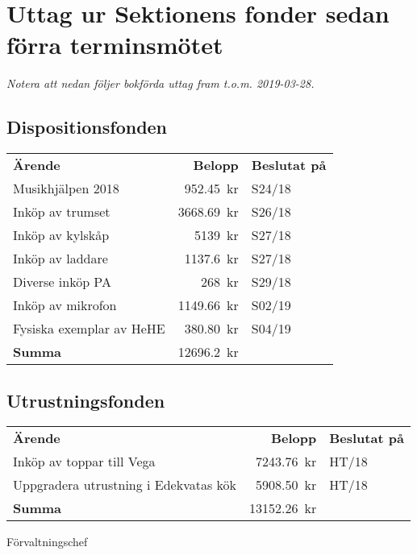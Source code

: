 \documentclass[../_main/handlingar.tex]{subfiles}
\begin{document}
\section{Uttag ur Sektionens fonder sedan förra terminsmötet}
\emph{Notera att nedan följer bokförda uttag fram t.o.m. 2019-03-28.}

\subsection*{Dispositionsfonden}
\begin{tabular}{l r l}
    \textbf{Ärende} & \textbf{Belopp} & \textbf{Beslutat på} \\
    Musikhjälpen 2018 & \SI{952,45}{kr} & S24/18 \\
    Inköp av trumset & \SI{3668,69}{kr} & S26/18 \\
    Inköp av kylskåp & \SI{5 139}{kr} & S27/18 \\
    Inköp av laddare & \SI{1137,6}{kr} & S27/18 \\
    Diverse inköp PA & \SI{268}{kr} & S29/18 \\
    Inköp av mikrofon & \SI{1149,66}{kr} & S02/19 \\
    Fysiska exemplar av HeHE & \SI{380,80}{kr} & S04/19 \\
    \hline
    \textbf{Summa} & \SI{12696,2}{kr} \\
\end{tabular}

\subsection*{Utrustningsfonden}
\begin{tabular}{l r l}
    \textbf{Ärende} & \textbf{Belopp} & \textbf{Beslutat på} \\
    Inköp av toppar till Vega & \SI{7243,76}{kr} & HT/18 \\
    Uppgradera utrustning i Edekvatas kök & \SI{5908,50}{kr} & HT/18\\
    \hline
    \textbf{Summa} & \SI{13152,26}{kr} \\
\end{tabular}

\begin{signatures}{1}
    \ist
    \signature{\fvc}{Förvaltningschef}
\end{signatures}
\end{document}
